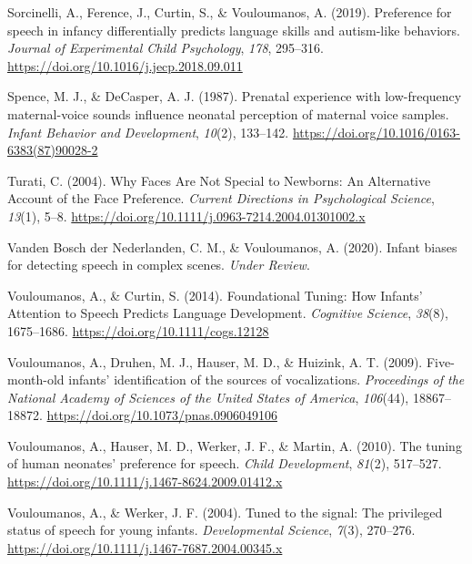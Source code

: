 \documentclass[
  man]{apa6}
\begin{document}
\leavevmode\hypertarget{ref-sorcinelli_preference_2019}{}%
Sorcinelli, A., Ference, J., Curtin, S., \& Vouloumanos, A. (2019). Preference for speech in infancy differentially predicts language skills and autism-like behaviors. \emph{Journal of Experimental Child Psychology}, \emph{178}, 295--316. \url{https://doi.org/10.1016/j.jecp.2018.09.011}

\leavevmode\hypertarget{ref-spence_prenatal_1987}{}%
Spence, M. J., \& DeCasper, A. J. (1987). Prenatal experience with low-frequency maternal-voice sounds influence neonatal perception of maternal voice samples. \emph{Infant Behavior and Development}, \emph{10}(2), 133--142. \url{https://doi.org/10.1016/0163-6383(87)90028-2}

\leavevmode\hypertarget{ref-turati_why_2004}{}%
Turati, C. (2004). Why Faces Are Not Special to Newborns: An Alternative Account of the Face Preference. \emph{Current Directions in Psychological Science}, \emph{13}(1), 5--8. \url{https://doi.org/10.1111/j.0963-7214.2004.01301002.x}

\leavevmode\hypertarget{ref-vanden_bosch_der_nederlanden_infant_2020}{}%
Vanden Bosch der Nederlanden, C. M., \& Vouloumanos, A. (2020). Infant biases for detecting speech in complex scenes. \emph{Under Review}.

\leavevmode\hypertarget{ref-vouloumanos_foundational_2014}{}%
Vouloumanos, A., \& Curtin, S. (2014). Foundational Tuning: How Infants' Attention to Speech Predicts Language Development. \emph{Cognitive Science}, \emph{38}(8), 1675--1686. \url{https://doi.org/10.1111/cogs.12128}

\leavevmode\hypertarget{ref-vouloumanos_five-month-old_2009}{}%
Vouloumanos, A., Druhen, M. J., Hauser, M. D., \& Huizink, A. T. (2009). Five-month-old infants' identification of the sources of vocalizations. \emph{Proceedings of the National Academy of Sciences of the United States of America}, \emph{106}(44), 18867--18872. \url{https://doi.org/10.1073/pnas.0906049106}

\leavevmode\hypertarget{ref-vouloumanos_tuning_2010}{}%
Vouloumanos, A., Hauser, M. D., Werker, J. F., \& Martin, A. (2010). The tuning of human neonates' preference for speech. \emph{Child Development}, \emph{81}(2), 517--527. \url{https://doi.org/10.1111/j.1467-8624.2009.01412.x}

\leavevmode\hypertarget{ref-vouloumanos_tuned_2004}{}%
Vouloumanos, A., \& Werker, J. F. (2004). Tuned to the signal: The privileged status of speech for young infants. \emph{Developmental Science}, \emph{7}(3), 270--276. \url{https://doi.org/10.1111/j.1467-7687.2004.00345.x}
\end{document}
